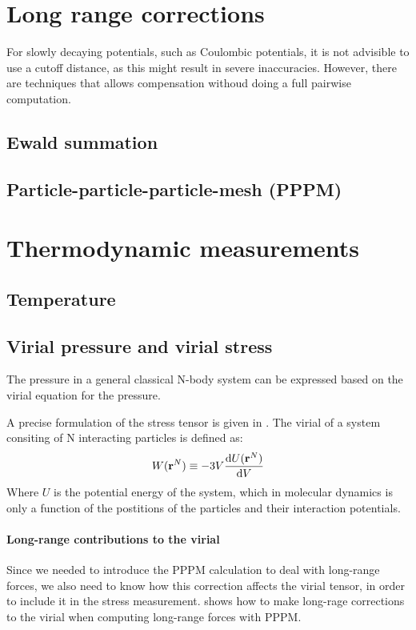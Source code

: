 \section{Long range corrections}
For slowly decaying potentials, such as Coulombic potentials, it is not advisible to use a cutoff distance, as this might result in severe inaccuracies. However, there are techniques that allows compensation withoud doing a full pairwise computation. 
\subsection{Ewald summation}
\subsection{Particle-particle-particle-mesh (PPPM)}

\section{Thermodynamic measurements}
\subsection{Temperature}
\subsection{Virial pressure and virial stress}
The pressure in a general classical N-body system can be expressed based on the virial equation for the pressure.

A precise formulation of the stress tensor is given in \cite{Thompson2009}.
The virial of a system consiting of N interacting particles is defined as:
\begin{equation}
	W(\mathbf{r}^N) \equiv -3V\frac{\mathrm{d} U(\mathbf{r}^N)}{\mathrm{d} V}
\end{equation}
Where $U$ is the potential energy of the system, which in molecular dynamics is only a function of the postitions of the particles and their interaction potentials.


\paragraph{Long-range contributions to the virial}
Since we needed to introduce the PPPM calculation to deal with long-range forces, we also need to know how this correction affects the virial tensor, in order to include it in the stress measurement. \cite{Sirk2013} shows how to make long-rage corrections to the virial when computing long-range forces with PPPM.


